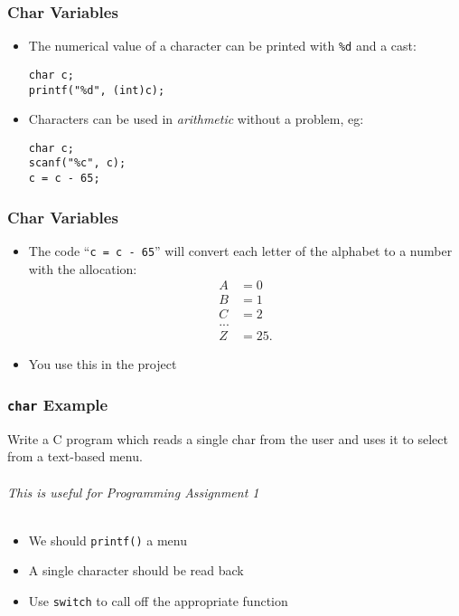 \documentclass[14pt]{beamer}
\begin{document}
\begin{frame}[fragile]
\frametitle{Char Variables}
\begin{itemize}
\item The numerical value of a character can be printed with \texttt{\%d} and a cast:
\begin{lstlisting}[style=CStyle]
char c;
printf("%d", (int)c);
\end{lstlisting}
\item Characters can be used in \textit{arithmetic} without a problem, eg:
\begin{lstlisting}[style=CStyle]
char c;
scanf("%c", c);
c = c - 65;
\end{lstlisting}
\pause

\end{itemize}
\end{frame}

\begin{frame}
\frametitle{Char Variables}
\begin{itemize}
\item The code ``\texttt{c = c - 65}'' will convert each letter of the alphabet to a number with the allocation:
\begin{align*}
A&=0\\
B&=1\\
C&=2\\
 ...\\
Z&=25.
\end{align*}
\pause
\vspace{-5mm}
\item You use this in the project
\end{itemize}
\end{frame}

\begin{frame}
\frametitle{\texttt{char} Example}
Write a C program which reads a single char from the user and uses it to select from a text-based menu.\\
~\\
\textit{This is useful for Programming Assignment 1}\\
~\\
\pause
\begin{itemize}
\item We should \texttt{printf()} a menu
\item A single character should be read back
\item Use \texttt{switch} to call off the appropriate function
\end{itemize}
\end{frame}
\end{document}
